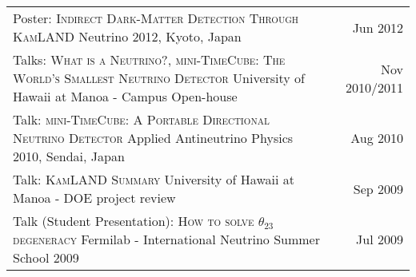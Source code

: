 \documentclass[10pt]{article} %
\begin{document}
\begin{tabularx}{\linewidth}{@{{}\textbullet\enskip}X@{\quad}r@{}}
\addlinespace[5pt]
Poster: \textsc{Indirect Dark-Matter Detection Through KamLAND} \newline Neutrino 2012, Kyoto, Japan & Jun 2012 \\

\addlinespace[5pt]
Talks: \textsc{What is a Neutrino?}, \textsc{mini-TimeCube: The World's Smallest Neutrino Detector} \newline University of Hawaii at Manoa - Campus Open-house & Nov 2010/2011 \\

\addlinespace[5pt]
Talk: \textsc{mini-TimeCube: A Portable Directional Neutrino Detector} \newline Applied Antineutrino Physics 2010, Sendai, Japan & Aug 2010 \\

\addlinespace[5pt]
Talk: \textsc{KamLAND Summary} \newline University of Hawaii at Manoa - DOE project review & Sep 2009 \\

\addlinespace[5pt]
Talk (Student Presentation): \textsc{How to solve $\theta_{23}$ degeneracy} \newline Fermilab - International Neutrino Summer School 2009 & Jul 2009 \\

\end{tabularx}


\clearpage
\renewcommand\refname{Publications} %

\nocite{*} %
%
\end{document}
